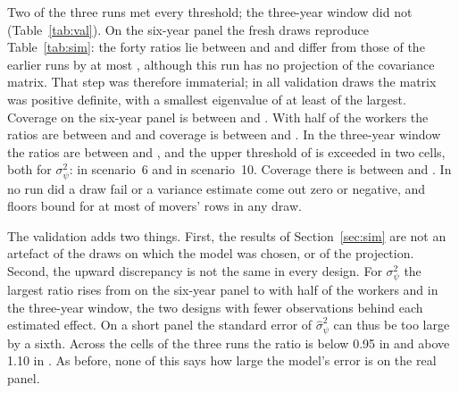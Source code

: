 Two of the three runs met every threshold; the three-year window did not (Table~\ref{tab:val}). On the
six-year panel the fresh draws reproduce Table~\ref{tab:sim}: the forty ratios lie between
 and  and differ from those of the earlier runs by at most
, although this run has no projection of the covariance matrix. That step was therefore
immaterial; in all  validation draws the matrix was positive definite, with a smallest
eigenvalue of at least  of the largest. Coverage on the six-year panel is between
 and . With half of the workers the ratios are between
 and  and coverage is between  and
. In the three-year window the ratios are between  and
, and the upper threshold of  is exceeded in two cells, both for
$\sigma^2_\psi$:  in scenario~6 and  in scenario~10. Coverage there is between
 and . In no run did a draw fail or a variance estimate come out zero or
negative, and floors bound for at most  of movers' rows in any draw.

The validation adds two things. First, the results of Section~\ref{sec:sim} are not an artefact of the draws on
which the model was chosen, or of the projection. Second, the upward discrepancy is not the same in every
design. For $\sigma^2_\psi$ the largest ratio rises from  on the six-year panel to
 with half of the workers and  in the three-year window, the two designs
with fewer observations behind each estimated effect. On a short panel the standard error of
$\hat\sigma^2_\psi$ can thus be too large by a sixth. Across the  cells of the three runs the ratio
is below 0.95 in  and above 1.10 in . As before, none of this says how
large the model's error is on the real panel.
